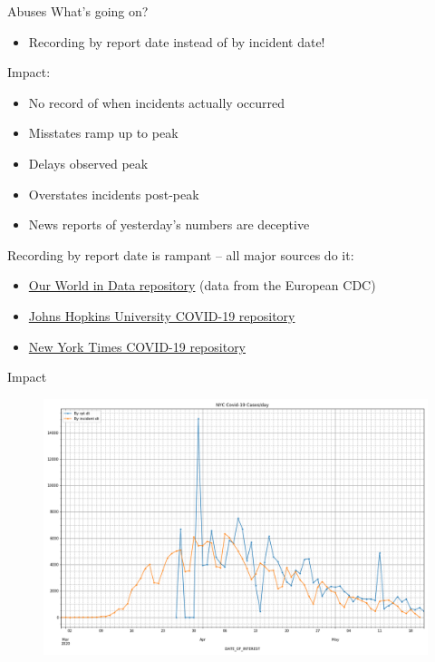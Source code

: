 \documentclass[aspectratio=169]{beamer}
\begin{document}
\begin{frame}{Abuses}
  What's going on?
  \begin{itemize}
  \item Recording by report date instead of by incident date!
  \end{itemize}
  
  Impact:
  \begin{itemize}
  \item No record of when incidents actually occurred
  \item Misstates ramp up to peak
  \item Delays observed peak
  \item Overstates incidents post-peak
  \item News reports of yesterday's numbers are deceptive
  \end{itemize}

  Recording by report date is rampant -- all major sources do it:
  \begin{itemize}
  \item \href{https://github.com/owid/covid-19-data}{Our World in Data
    repository} (data from the European CDC)
  \item \href{https://github.com/CSSEGISandData/COVID-19}{Johns Hopkins
    University COVID-19 repository}
  \item \href{https://github.com/nytimes/covid-19-data}{New York Times
    COVID-19 repository}
  \end{itemize}
\end{frame}

\begin{frame}{Impact}
  \begin{figure}
    \centering
    \includegraphics[height=.8\textheight]{../Notebooks/casesPerDayHistoryRptDtVsInDtRaw.png}
  \end{figure}
\end{frame}
\end{document}
